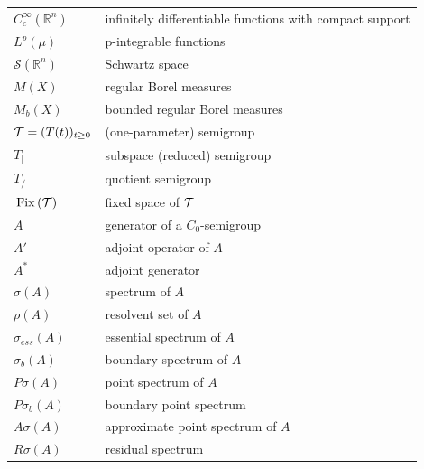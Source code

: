 \begin{longtable}{p{}p{}}
$C_{c}^{\infty}(\mathbb{R}^{n})$ & infinitely differentiable functions with compact support \\ %
$L^{p}(\mu)$ & p-integrable functions \\ %
$\mathcal{S}(\mathbb{R}^n)$ & Schwartz space \\ %
$M(X)$ & regular Borel measures \\ %
$M_{b}(X)$ & bounded regular Borel measures \\ %
$\TT = (T(t))_{t \geq 0}$ & (one-parameter) semigroup \\ %
$T_{|}$ & subspace (reduced) semigroup \\ %
$T_{/}$ & quotient semigroup \\ %
$\mathop{}\mathrm{Fix}\left(\mathcal{T}\right)$ & fixed space of $\mathcal{T}$ \\ %
$A$ & generator of a $C_{0}$-semigroup\\ %
$A'$ & adjoint operator of $A$\\ %
$A^*$ & adjoint generator \\ %
$\sigma(A)$ & spectrum of $A$\\ %
$\rho(A)$ & resolvent set of $A$\\ %
$\sigma_{ess}(A)$ & essential spectrum of $A$\\ %
$\sigma_{b}(A)$ & boundary spectrum of $A$\\ %
$P{\sigma}(A)$ & point spectrum of $A$\\ %
$P{\sigma_b}(A)$ & boundary point spectrum \\ %
$A\sigma(A)$ & approximate point spectrum of $A$\\ %
$R{\sigma}(A)$ & residual spectrum \\ %

\end{longtable}
